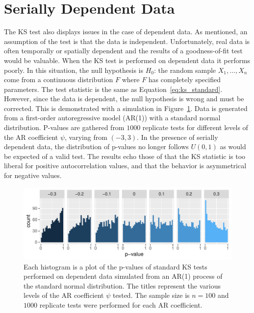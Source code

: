 \documentclass[12pt, letterpaper, titlepage]{article}
\begin{document}
\section{Serially Dependent Data}
\label{sec:dependence}

The KS test also displays issues in the case of dependent data. As mentioned, an 
assumption of the test is that the data is independent. Unfortunately, real data
is often temporally or spatially dependent and the results of a goodness-of-fit 
test would be valuable. When the KS test is performed on dependent data it 
performs poorly. In this situation, the null hypothesis is $H_0$: the random 
sample $X_1, \ldots, X_n$ come from a continuous distribution $F$ where $F$ has 
completely specified parameters. The test statistic is the same as 
Equation~\ref{eq:ks_standard}. However, since the data is dependent, the null 
hypothesis is wrong and must be corrected. This is demonstrated with a 
simulation in Figure~\ref{fig:hist_correlation}. Data is generated from a 
first-order autoregressive model (AR(1)) with a standard normal distribution. 
P-values are gathered from $1000$ replicate tests for different levels of the 
AR coefficient $\psi$, varying from $(-3,3)$. In the presence of serially 
dependent data, the distribution of p-values no longer follows $U(0, 1)$ as 
would be expected of a valid test. The results echo those of \citet{Durilleul} 
that the KS statistic is too liberal for positive autocorrelation values, and 
that the behavior is asymmetrical for negative values.

\begin{figure}[tbp]
  \centering
  \includegraphics[width=\textwidth]{hist_correlation}
  \caption{Each histogram is a plot of the p-values of standard KS tests
  performed on dependent data simulated from an AR(1) process of the standard 
  normal distribution. The titles represent the various levels of the AR 
  coefficient $\psi$ tested. The sample size is $n = 100$ and $1000$ replicate 
  tests were performed for each AR coefficient.}
  \label{fig:hist_correlation}
\end{figure}
\end{document}
